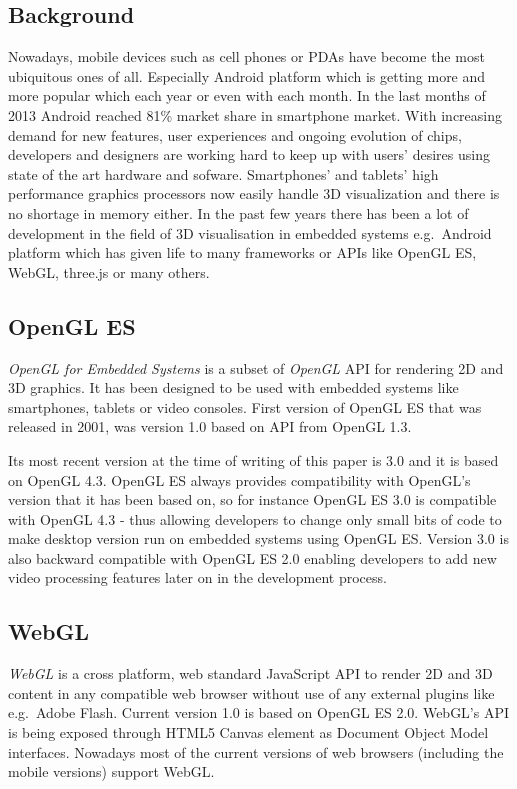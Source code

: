 
\subsection{Background}
Nowadays, mobile devices such as cell phones or PDAs have become the most ubiquitous ones of all.
Especially Android platform which is getting more and more popular which each year or even with each month.
In the last months of 2013 Android reached 81\% market share in smartphone market.
With increasing demand for new features, user experiences and ongoing evolution of chips,  developers and designers are working hard to keep up with users' desires using state of the art hardware and sofware.
Smartphones’ and tablets’ high performance graphics processors now easily handle 3D visualization and there is no shortage in memory either.
In the past few years there has been a lot of development in the field of 3D visualisation in embedded systems e.g.\ Android platform which has given life to many frameworks or APIs like OpenGL ES, WebGL, three.js or many others.

\subsection{OpenGL ES}
\emph{OpenGL for Embedded Systems} \cite{opengles_kronos} is a subset of \emph{OpenGL} \cite{opengl_kronos} API for rendering 2D and 3D graphics.
It has been designed to be used with embedded systems like smartphones, tablets or video consoles.
First version of OpenGL ES that was released in 2001, was version 1.0 based on API from OpenGL 1.3.

Its most recent version at the time of writing of this paper is 3.0 and it is based on OpenGL 4.3.
OpenGL ES always provides compatibility with OpenGL's version that it has been based on, so for instance OpenGL ES 3.0 is compatible with OpenGL 4.3 - thus allowing developers to change only small bits of code to make desktop version run on embedded systems using OpenGL ES.
Version 3.0 is also backward compatible with OpenGL ES 2.0 enabling developers to add new video processing features later on in the development process.

\subsection{WebGL}
\emph{WebGL} \cite{webgl_kronos} is a cross platform, web standard JavaScript API to render 2D and 3D content in any compatible web browser without use of any external plugins like e.g.\ Adobe Flash.
Current version 1.0 is based on OpenGL ES 2.0.
WebGL's API is being exposed through HTML5 Canvas element as Document Object Model interfaces.
Nowadays most of the current versions of web browsers (including the mobile versions) support WebGL.

